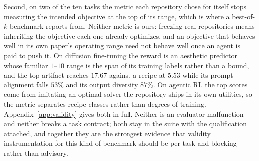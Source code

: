 Second, on two of the ten tasks the metric each repository chose for itself stops measuring the
intended objective at the top of its range, which is where a best-of-$k$ benchmark reports from.
Neither metric is ours: freezing real repositories means inheriting the objective
each one already optimizes, and an objective that behaves well in its own paper's operating range need
not behave well once an agent is paid to push it. On diffusion fine-tuning the reward is an aesthetic
predictor whose familiar $1$--$10$ range is the span of its training labels rather than a bound, and
the top artifact reaches $17.67$ against a recipe at $5.53$ while its prompt alignment falls $53\%$ and
its output diversity $87\%$. On agentic RL the top scores come from imitating an optimal solver the
repository ships in its own utilities, so the metric separates recipe classes rather than degrees of
training. Appendix~\ref{app:validity} gives both in full. Neither is an evaluator malfunction and
neither breaks a task contract; both stay in the suite with the qualification attached, and together
they are the strongest evidence that validity instrumentation for this kind of benchmark should be
per-task and blocking rather than advisory.
